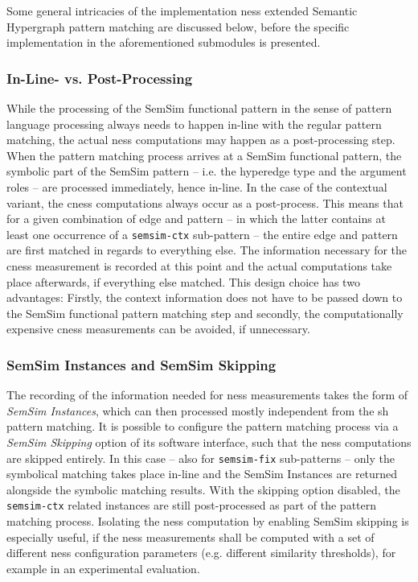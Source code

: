 \documentclass[11pt, numbers=noenddot]{scrreprt}
\begin{document}
Some general intricacies of the implementation \gls{ness} extended Semantic Hypergraph pattern matching are discussed below, before the specific implementation in the aforementioned submodules is presented.


\subsubsection{In-Line- vs. Post-Processing}
While the processing of the SemSim functional pattern in the sense of pattern language processing always needs to happen in-line with the regular pattern matching, the actual \gls{ness} computations may happen as a post-processing step. When the pattern matching process arrives at a SemSim functional pattern, the symbolic part of the SemSim pattern -- i.e. the hyperedge type and the argument roles -- are processed immediately, hence in-line. In the case of the contextual variant, the \gls{cness} computations always occur as a post-process. This means that for a given combination of edge and pattern -- in which the latter contains at least one occurrence of a \texttt{semsim-ctx} sub-pattern --  the entire edge and pattern are first matched in regards to everything else. The information necessary for the \gls{cness} measurement is recorded at this point and the actual computations take place afterwards, if everything else matched. This design choice has two advantages: Firstly, the context information does not have to be passed down to the SemSim functional pattern matching step and secondly, the computationally expensive \gls{cness} measurements can be avoided, if unnecessary.

\subsubsection{SemSim Instances and SemSim Skipping}
The recording of the information needed for \gls{ness} measurements takes the form of \textit{SemSim Instances}, which can then processed mostly independent from the \gls{sh} pattern matching.  
It is possible to configure the pattern matching process via a \textit{SemSim Skipping} option of its software interface, such that the \gls{ness} computations are skipped entirely. In this case -- also for \texttt{semsim-fix} sub-patterns -- only the symbolical matching takes place in-line and the SemSim Instances are returned alongside the symbolic matching results. With the skipping option disabled, the \texttt{semsim-ctx} related instances are still post-processed as part of the pattern matching process. Isolating the \gls{ness} computation by enabling SemSim skipping is especially useful, if the \gls{ness} measurements shall be computed with a set of different \gls{ness} configuration parameters (e.g. different similarity thresholds), for example in an experimental evaluation.
\end{document}
